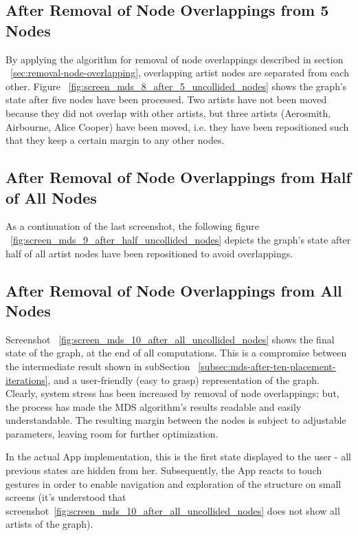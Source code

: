 \subsection{After Removal of Node Overlappings from 5 Nodes}

By applying the algorithm for removal of node overlappings described in section ~\ref{sec:removal-node-overlapping}, overlapping artist nodes are separated from each other. Figure ~\ref{fig:screen_mds_8_after_5_uncollided_nodes} shows the graph's state after five nodes have been processed. Two artists have not been moved because they did not overlap with other artists, but three artists (Aerosmith, Airbourne, Alice Cooper) have been moved, i.e. they have been repositioned such that they keep a certain margin to any other nodes.

\subsection{After Removal of Node Overlappings from Half of All Nodes}

As a continuation of the last screenshot, the following figure ~\ref{fig:screen_mds_9_after_half_uncollided_nodes} depicts the graph's state after half of all artist nodes have been repositioned to avoid overlappings.

\subsection{After Removal of Node Overlappings from All Nodes}

Screenshot ~\ref{fig:screen_mds_10_after_all_uncollided_nodes} shows the final state of the graph, at the end of all computations. This is a compromise between the intermediate result shown in subSection ~\ref{subsec:mds-after-ten-placement-iterations}, and a user-friendly (easy to grasp) representation of the graph. Clearly, system stress has been increased by removal of node overlappings; but, the process has made the MDS algorithm's results readable and easily understandable. The resulting margin between the nodes is subject to adjustable parameters, leaving room for further optimization.

In the actual App implementation, this is the first state displayed to the user - all previous states are hidden from her. Subsequently, the App reacts to touch gestures in order to enable navigation and exploration of the structure on small screens (it's understood that screenshot~\ref{fig:screen_mds_10_after_all_uncollided_nodes} does not show all artists of the graph).


